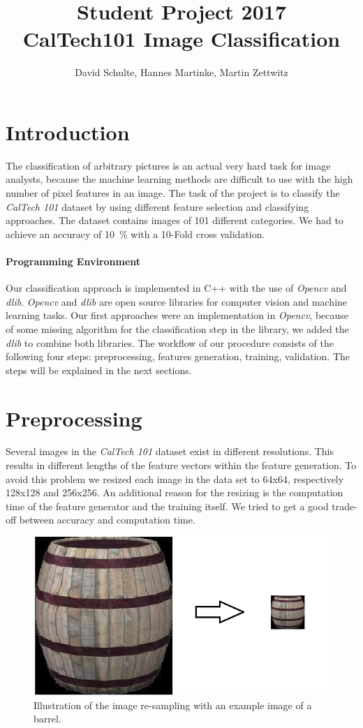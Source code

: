 \documentclass[a4paper,10pt]{article}
\title{ Student Project 2017 \\ CalTech101 Image Classification}
\author{David Schulte, Hannes Martinke, Martin Zettwitz}
\begin{document}
\maketitle

\section{Introduction}
The classification of arbitrary pictures is an actual very hard task for image analysts, because the machine learning methods are difficult to use with the high number of pixel features in an image.
The task of the project is to classify the \emph{CalTech 101} dataset by using different feature selection and classifying approaches. 
The dataset contains images of 101 different categories. We had to achieve an accuracy of 10~\% with a 10-Fold cross validation.

\paragraph{Programming Environment}
Our classification approach is implemented in C++ with the use of \emph{Opencv} and \emph{dlib}.
\emph{Opencv} and \emph{dlib} are open source libraries for computer vision and machine learning tasks. 
Our first approaches were an implementation in \emph{Opencv}, because of some missing algorithm for the classification step in the library, we added the \emph{dlib} to combine both libraries.
The workflow of our procedure consists of the following four steps: preprocessing, features generation, training, validation.
The steps will be explained in the next sections.

\section{Preprocessing}
\label{sec:preprocessing}
Several images in the \emph{CalTech 101} dataset exist in different resolutions. 
This results in different lengths of the feature vectors within the feature generation.
To avoid this problem we resized each image in the data set to 64x64, respectively 128x128 and 256x256.
An additional reason for the resizing is the computation time of the feature generator and the training itself. 
We tried to get a good trade-off between accuracy and computation time.
\begin{figure}[ht]
\centering
\includegraphics[scale=0.5]{images/preprocessing.png}
\caption{Illustration of the image re-sampling with an example image of a barrel.}
\label{fig:resize}
\end{figure}
\end{document}
